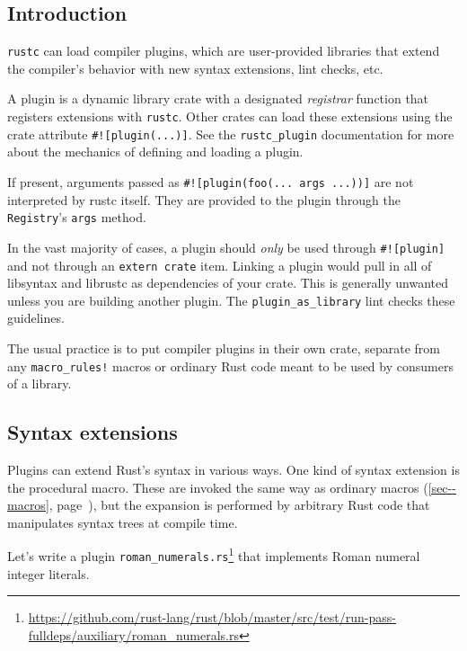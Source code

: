 \documentclass[a4paper,]{book}
\renewcommand*{\hyperlink}[2]{%
 #2 (\autoref{#1}, page~\pageref{#1})}
\renewcommand{\href}[2]{#2\footnote{\url{#1}}}
\begin{document}
\subsection{Introduction}\label{introduction-2}

\texttt{rustc} can load compiler plugins, which are user-provided
libraries that extend the compiler's behavior with new syntax
extensions, lint checks, etc.

A plugin is a dynamic library crate with a designated \emph{registrar}
function that registers extensions with \texttt{rustc}. Other crates can
load these extensions using the crate attribute
\texttt{\#!{[}plugin(...){]}}. See the \texttt{rustc\_plugin}
documentation for more about the mechanics of defining and loading a
plugin.

If present, arguments passed as
\texttt{\#!{[}plugin(foo(...\ args\ ...)){]}} are not interpreted by
rustc itself. They are provided to the plugin through the
\texttt{Registry}'s \texttt{args} method.

In the vast majority of cases, a plugin should \emph{only} be used
through \texttt{\#!{[}plugin{]}} and not through an
\texttt{extern\ crate} item. Linking a plugin would pull in all of
libsyntax and librustc as dependencies of your crate. This is generally
unwanted unless you are building another plugin. The
\texttt{plugin\_as\_library} lint checks these guidelines.

The usual practice is to put compiler plugins in their own crate,
separate from any \texttt{macro\_rules!} macros or ordinary Rust code
meant to be used by consumers of a library.

\subsection{Syntax extensions}\label{syntax-extensions}

Plugins can extend Rust's syntax in various ways. One kind of syntax
extension is the procedural macro. These are invoked the same way as
\protect\hyperlink{sec--macros}{ordinary macros}, but the expansion is
performed by arbitrary Rust code that manipulates syntax trees at
compile time.

Let's write a plugin
\href{https://github.com/rust-lang/rust/blob/master/src/test/run-pass-fulldeps/auxiliary/roman_numerals.rs}{\texttt{roman\_numerals.rs}}
that implements Roman numeral integer literals.
\end{document}
